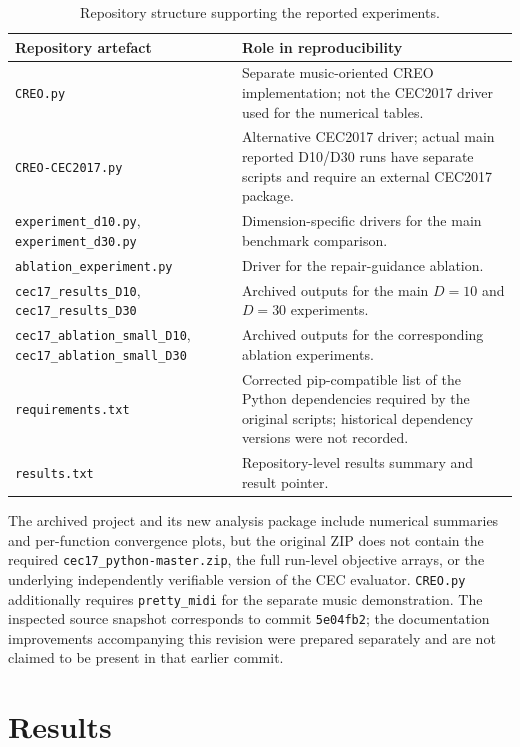 \documentclass[journal]{IEEEtran}
\begin{document}
\begin{table}[t]
\centering
\caption{Repository structure supporting the reported experiments.}
\label{tab:repo}
\small
\begin{tabular}{p{} p{}}
\toprule
\textbf{Repository artefact} & \textbf{Role in reproducibility}\\
\midrule
\texttt{CREO.py} & Separate music-oriented CREO implementation; not the CEC2017 driver used for the numerical tables.\\
\texttt{CREO-CEC2017.py} & Alternative CEC2017 driver; actual main reported D10/D30 runs have separate scripts and require an external CEC2017 package.\\
\texttt{experiment\_d10.py}, \texttt{experiment\_d30.py} & Dimension-specific drivers for the main benchmark comparison.\\
\texttt{ablation\_experiment.py} & Driver for the repair-guidance ablation.\\
\texttt{cec17\_results\_D10}, \texttt{cec17\_results\_D30} & Archived outputs for the main $D=10$ and $D=30$ experiments.\\
\texttt{cec17\_ablation\_small\_D10}, \texttt{cec17\_ablation\_small\_D30} & Archived outputs for the corresponding ablation experiments.\\
\texttt{requirements.txt} & Corrected pip-compatible list of the Python dependencies required by the original scripts; historical dependency versions were not recorded.\\
\texttt{results.txt} & Repository-level results summary and result pointer.\\
\bottomrule
\end{tabular}
\end{table}

The archived project and its new analysis package include numerical summaries and per-function convergence plots, but the original ZIP does not contain the required \texttt{cec17\_python-master.zip}, the full run-level objective arrays, or the underlying independently verifiable version of the CEC evaluator. \texttt{CREO.py} additionally requires \texttt{pretty\_midi} for the separate music demonstration. The inspected source snapshot corresponds to commit \texttt{5e04fb2}; the documentation improvements accompanying this revision were prepared separately and are not claimed to be present in that earlier commit.

\section{Results}
\end{document}
